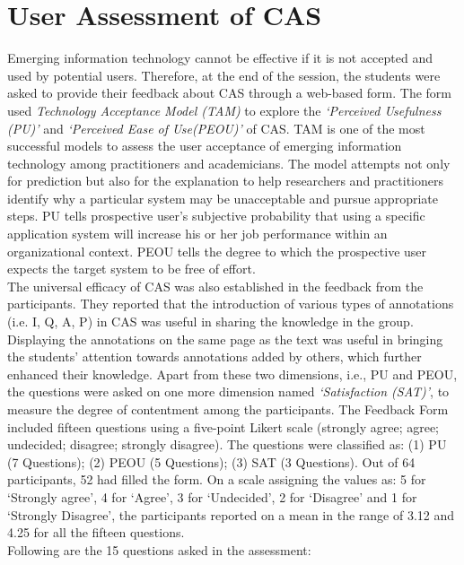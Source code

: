 \documentclass{llncs}
\begin{document}
\section{User Assessment of CAS}\label{sec:assessment}
Emerging information technology cannot be effective if it is not accepted and used by potential users. Therefore, at the end of the session, the students were asked to provide their feedback about CAS through a web-based form. The form used \textit{Technology Acceptance Model (TAM)} to explore the \textit{`Perceived Usefulness (PU)'} and \textit{`Perceived Ease of Use(PEOU)'} of CAS\cite{Fred1989}. TAM is one of the most successful models to assess the user acceptance of emerging information technology among practitioners and academicians. The model attempts not only for prediction but also for the explanation to help researchers and practitioners identify why a particular system may be unacceptable and pursue appropriate steps. PU tells prospective user’s subjective probability that using a specific application system will increase his or her job performance within an organizational context. PEOU tells the degree to which the prospective user expects the target system to be free of effort.\\
The universal efficacy of CAS was also established in the feedback from the participants. They reported that the introduction of various types of annotations (i.e. I, Q, A, P) in CAS was useful in sharing the knowledge in the group. Displaying the annotations on the same page as the text was useful in bringing the students’ attention towards annotations added by others, which further enhanced their knowledge.
Apart from these two dimensions, i.e., PU and PEOU, the questions were asked on one more dimension named \textit{`Satisfaction (SAT)'}, to measure the degree of contentment among the participants. The Feedback Form included fifteen questions using a five-point Likert scale (strongly agree; agree; undecided; disagree; strongly disagree). The questions were classified as: (1) PU (7 Questions); (2) PEOU (5 Questions); (3) SAT (3 Questions). Out of 64 participants, 52 had filled the form.  On a scale assigning the values as: 5 for ‘Strongly agree’, 4 for ‘Agree’, 3 for ‘Undecided’, 2 for ‘Disagree’ and 1 for ‘Strongly Disagree’, the participants reported on a mean in the range of 3.12 and 4.25 for all the fifteen questions.\\
Following are the 15 questions asked in the assessment:
\end{document}
